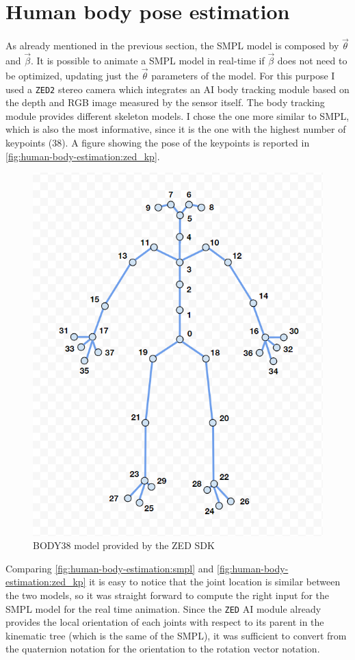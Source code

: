 \section{Human body pose estimation}
As already mentioned in the previous section, the SMPL model is composed by $\vec{\theta}$ and $\vec{\beta}$. It is possible to animate a SMPL model in real-time if $\vec{\beta}$ does not need to be optimized, updating just the $\vec{\theta}$ parameters of the model.
For this purpose I used a \verb|ZED2| stereo camera which integrates an AI body tracking module\cite{zed_body_tracking} based on the depth and RGB image measured by the sensor itself. The body tracking module provides different skeleton models. I chose the one more similar to SMPL, which is also the most informative, since it is the one with the highest number of keypoints (38). A figure showing the pose of the keypoints is reported in \autoref{fig:human-body-estimation:zed_kp}.
\begin{figure}[H]
    \centering
    \includegraphics[width=0.5\linewidth]{images/zed_kp.png}
    \caption{BODY38 model provided by the ZED SDK}
    \label{fig:human-body-estimation:zed_kp}
\end{figure}
Comparing \autoref{fig:human-body-estimation:smpl} and \autoref{fig:human-body-estimation:zed_kp} it is easy to notice that the joint location is similar between the two models, so it was straight forward to compute the right input for the SMPL model for the real time animation. Since the \verb|ZED| AI module already provides the local orientation of each joints with respect to its parent in the kinematic tree (which is the same of the SMPL), it was sufficient to convert from the quaternion notation for the orientation to the rotation vector notation.

